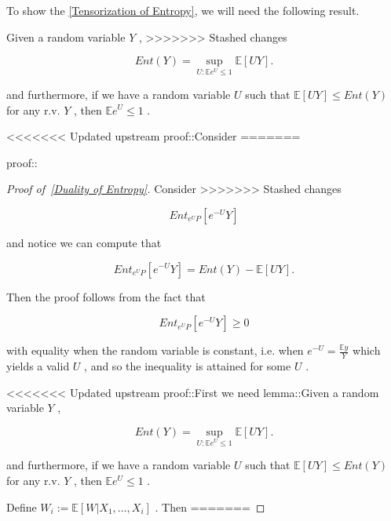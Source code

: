 \documentclass{article}
\begin{document}
To show the \autoref{Tensorization of Entropy}, we will need the following result.

\begin{lemma}
\label{Duality of Entropy}
Given a random variable  $Y$ ,
>>>>>>> Stashed changes


\begin{equation*}
Ent(Y) = \sup_{U: \mathbb{E} e^U \leq 1}\mathbb{E}[UY].
\end{equation*}

and furthermore, if we have a random variable  $U$  such that  $\mathbb{E}[UY] \leq Ent(Y)$  for any r.v.  $Y$ , then  $\mathbb{E}e^U\leq 1$ .

<<<<<<< Updated upstream
 proof::Consider
=======

\end{lemma}

proof::
\begin{proof}[Proof of~{\autoref{Duality of Entropy}}]
\label{proof:Duality of Entropy}
Consider
>>>>>>> Stashed changes


\begin{equation*}
Ent_{e^{U}P}[e^{-U}Y]
\end{equation*}

and notice we can compute that


\begin{equation*}
Ent_{e^{U}P}[e^{-U}Y] = Ent(Y) - \mathbb{E}[UY].
\end{equation*}

Then the proof follows from the fact that


\begin{equation*}
Ent_{e^{U}P}[e^{-U}Y] \geq 0
\end{equation*}

with equality when the random variable is constant, i.e. when  $e^{-U} = \frac{\mathbb{E}y}{Y}$  which yields a valid  $U$ , and so the inequality is attained for some  $U$ .

<<<<<<< Updated upstream
 proof::First we need lemma::Given a random variable  $Y$ ,


\begin{equation*}
Ent(Y) = \sup_{U: \mathbb{E} e^U \leq 1}\mathbb{E}[UY].
\end{equation*}

and furthermore, if we have a random variable  $U$  such that  $\mathbb{E}[UY] \leq Ent(Y)$  for any r.v.  $Y$ , then  $\mathbb{E}e^U\leq 1$ .

 Define  $W_i := \mathbb{E}[W| X_1, \dots, X_i]$ . Then
=======

\end{proof}
\end{document}
